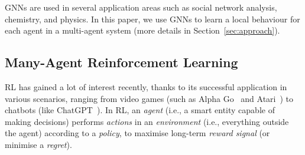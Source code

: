 \documentclass[conference]{IEEEtran}
\begin{document}
\acp{GNN} are used in several application areas such as social network analysis, chemistry, and physics.
In this paper, we use GNNs to learn a local behaviour for each agent in a multi-agent system (more details in Section~\ref{sec:approach}).
\subsection{Many-Agent Reinforcement Learning}

 \Ac{RL} has gained a lot of interest recently, 
 thanks to its successful application in various scenarios, 
 ranging from video games (such as Alpha Go~\cite{Silver2016Go} and Atari~\cite{Atari2016DQN}) 
 to chatbots (like ChatGPT~\cite{ChatGPT2023}). 
% 
In \ac{RL}, an \emph{agent} (i.e., a smart entity capable of making decisions) 
 performs \emph{actions} in an \emph{environment} (i.e., everything outside the agent) according to a \emph{policy}, 
 to maximise long-term \emph{reward signal} (or minimise a \emph{regret}).
\end{document}
